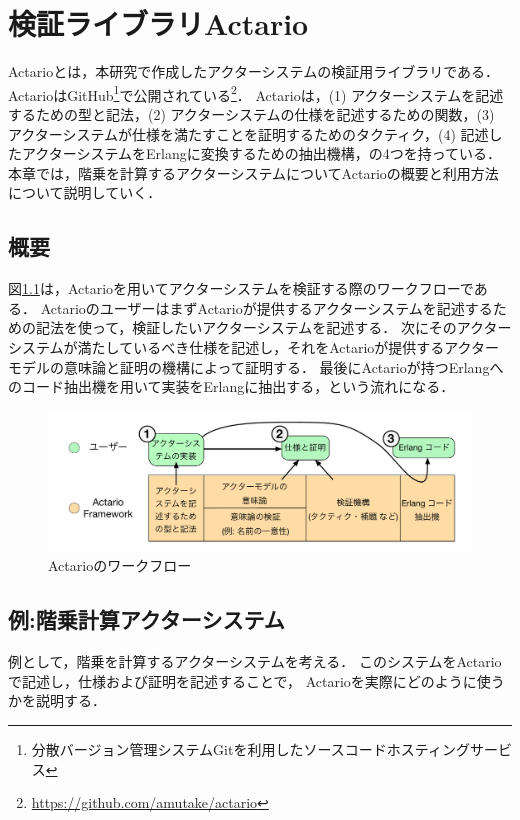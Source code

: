 \chapter{検証ライブラリActario}
\label{chapter:overview}

Actario\cite{Yasutake:2015aa}とは，本研究で作成したアクターシステムの検証用ライブラリである．
ActarioはGitHub\footnote{分散バージョン管理システムGitを利用したソースコードホスティングサービス}で公開されている\footnote{\url{https://github.com/amutake/actario}}．
Actarioは，(1) アクターシステムを記述するための型と記法，(2) アクターシステムの仕様を記述するための関数，(3) アクターシステムが仕様を満たすことを証明するためのタクティク，(4) 記述したアクターシステムをErlangに変換するための抽出機構，の4つを持っている．
本章では，階乗を計算するアクターシステムについてActarioの概要と利用方法について説明していく．

\section{概要}

図\ref{img:overview:workflow}は，Actarioを用いてアクターシステムを検証する際のワークフローである．
ActarioのユーザーはまずActarioが提供するアクターシステムを記述するための記法を使って，検証したいアクターシステムを記述する．
次にそのアクターシステムが満たしているべき仕様を記述し，それをActarioが提供するアクターモデルの意味論と証明の機構によって証明する．
最後にActarioが持つErlangへのコード抽出機を用いて実装をErlangに抽出する，という流れになる．

\begin{figure}[tp]
  \centering
  \includegraphics[width=15cm]{./img/overview/workflow.pdf}
  \caption{Actarioのワークフロー}\label{img:overview:workflow}
\end{figure}

\section{例:階乗計算アクターシステム}

例として，階乗を計算するアクターシステムを考える．
このシステムをActarioで記述し，仕様および証明を記述することで，
Actarioを実際にどのように使うかを説明する．

